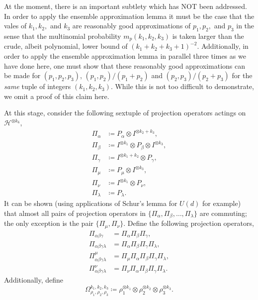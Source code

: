 \documentclass[notitlepage]{article}
\begin{document}
At the moment, there is an important subtlety which has NOT been addressed.
In order to apply the ensemble approximation lemma it must be the case that the vales of $k_1, k_2,$ and $k_3$ are reasonably good approximations of $p_1, p_2,$ and $p_3$ in the sense that the multinomial probability $m_{p}(k_1, k_2, k_3)$ is taken larger than the crude, albeit polynomial, lower bound of $(k_1+k_2+k_3+1)^{-2}$.
Additionally, in order to apply the ensemble approximation lemma in parallel three times as we have done here, one must show that these reasonably good approximations can be made for $(p_1, p_2, p_3)$, $(p_1, p_2)/(p_1+p_2)$ and $(p_2, p_3)/(p_2+p_3)$ for the \textit{same} tuple of integers $(k_1, k_2, k_3)$.
While this is not too difficult to demonstrate, we omit a proof of this claim here.

At this stage, consider the following sextuple of projection operators actings on $\mathcal H^{\otimes k_6}$,
\begin{align}
    \Pi_{\alpha} &\coloneqq P_{\alpha} \otimes I^{\otimes k_2 + k_3}, \\
    \Pi_{\beta} &\coloneqq I^{\otimes k_1} \otimes P_{\beta} \otimes I^{\otimes k_3}, \\
    \Pi_{\gamma} &\coloneqq I^{\otimes k_1 + k_2} \otimes P_{\gamma} , \\
    \Pi_{\mu} &\coloneqq P_{\mu} \otimes I^{\otimes k_3}, \\
    \Pi_{\nu} &\coloneqq I^{\otimes k_1} \otimes P_{\nu}, \\
    \Pi_{\lambda} &\coloneqq P_{\lambda}.
\end{align}
It can be shown (using applications of Schur's lemma for $U(d)$ for example) that almost all pairs of projection operators in $\{\Pi_{\alpha}, \Pi_{\beta}, \ldots, \Pi_{\lambda}\}$ are commuting; the only exception is the pair $\{ \Pi_{\mu}, \Pi_{\nu} \}$.
Define the following projection operators,
\begin{align}
    \Pi_{\alpha\beta\gamma} &= \Pi_{\alpha}\Pi_{\beta}\Pi_{\gamma}, \\
    \Pi_{\alpha\beta\gamma\lambda} &= \Pi_{\alpha}\Pi_{\beta}\Pi_{\gamma}\Pi_{\lambda}, \\
    \Pi^{\mu}_{\alpha\beta\gamma\lambda} &= \Pi_{\mu}\Pi_{\alpha}\Pi_{\beta}\Pi_{\gamma}\Pi_{\lambda}, \\
    \Pi^{\nu}_{\alpha\beta\gamma\lambda} &= \Pi_{\nu}\Pi_{\alpha}\Pi_{\beta}\Pi_{\gamma}\Pi_{\lambda}.
\end{align}
Additionally, define
\begin{equation}
    \Omega_{\rho_1,\rho_2,\rho_3}^{k_1, k_2, k_3} \coloneqq \rho_1^{\otimes k_1} \otimes \rho_2^{\otimes k_2} \otimes \rho_3^{\otimes k_3}.
\end{equation}
\end{document}
